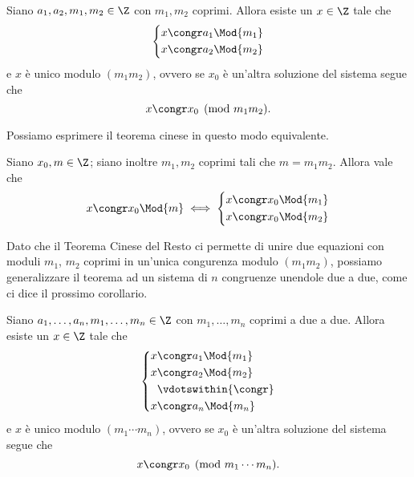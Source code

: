 \begin{theorem}
     \label{th_cinese}
    Siano $a_1, a_2, m_1, m_2 \in \Z$ con $m_1, m_2$ coprimi. Allora esiste un $x \in \Z$ tale che
    \begin{equation*}
        \left\{
        \begin{alignedat}{1}
            x&\congr a_1 \Mod{m_1}\\
            x&\congr a_2 \Mod{m_2}
        \end{alignedat}      
        \right . 
    \end{equation*}
    e $x$ è unico modulo $(m_1m_2)$, ovvero se $x_0$ è un'altra soluzione del sistema segue che
    \begin{equation}
        x \congr x_0 \pmod{m_1 m_2}.
    \end{equation} 
\end{theorem}

Possiamo esprimere il teorema cinese in questo modo equivalente.

\begin{theorem}
     \label{th_cinese_2}
    Siano $x_0, m \in \Z$; siano inoltre $m_1, m_2$ coprimi tali che $m = m_1m_2$. Allora vale che \begin{equation}
        x \congr x_0 \Mod{m} \iff \left\{
            \begin{alignedat}{1}
                x&\congr x_0 \Mod{m_1}\\
                x&\congr x_0 \Mod{m_2}
            \end{alignedat}      
            \right .
    \end{equation}
\end{theorem}

Dato che il Teorema Cinese del Resto ci permette di unire due equazioni con moduli $m_1$, $m_2$ coprimi in un'unica congurenza modulo $(m_1m_2)$, possiamo generalizzare il teorema ad un sistema di $n$ congruenze unendole due a due, come ci dice il prossimo corollario.

\begin{corollary}
    \label{th_cinese_n}
    Siano $a_1, \dots, a_n, m_1, \dots, m_n \in \Z$ con $m_1, \dots, m_n$ coprimi a due a due. Allora esiste un $x \in \Z$ tale che
    \begin{equation*}
        \left\{
        \begin{alignedat}{1}
            x&\congr a_1 \Mod{m_1}\\
            x&\congr a_2 \Mod{m_2}\\
            &\vdotswithin{\congr}\\
            x&\congr a_n \Mod{m_n}
        \end{alignedat}      
        \right . 
    \end{equation*}
    e $x$ è unico modulo $(m_1\cdots m_n)$, ovvero se $x_0$ è un'altra soluzione del sistema segue che
    \begin{equation}
        x \congr x_0 \pmod{m_1 \cdots m_n}.
    \end{equation} 
\end{corollary}

